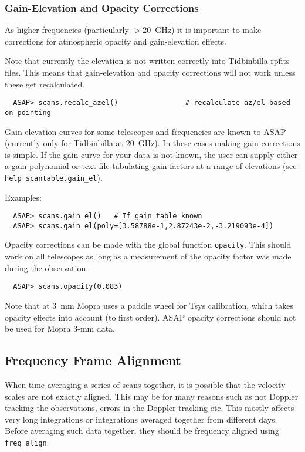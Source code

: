 \documentclass[11pt]{article}
\newcommand{\cmd}[1]{{\tt #1}}
\begin{document}
\subsubsection{Gain-Elevation and Opacity Corrections}
\label{sec:gainel}

As higher frequencies (particularly $>$20~GHz)
it is important to make corrections for atmospheric opacity and
gain-elevation effects.

Note that currently the elevation is not written correctly into
Tidbinbilla rpfits files. This means that gain-elevation and opacity
corrections will not work unless these get recalculated.

\begin{verbatim}
  ASAP> scans.recalc_azel()                # recalculate az/el based on pointing
\end{verbatim}

Gain-elevation curves for some telescopes and frequencies are known to
ASAP (currently only for Tidbinbilla at 20~GHz).  In these cases
making gain-corrections is simple.  If the gain curve for your data is
not known, the user can supply either a gain polynomial or text file
tabulating gain factors at a range of elevations (see \cmd{help
scantable.gain\_el}).

Examples:

\begin{verbatim}
  ASAP> scans.gain_el()   # If gain table known
  ASAP> scans.gain_el(poly=[3.58788e-1,2.87243e-2,-3.219093e-4])
\end{verbatim}

Opacity corrections can be made with the global
function \cmd{opacity}. This should work on all telescopes as long as
a measurement of the opacity factor was made during the observation.

\begin{verbatim}
  ASAP> scans.opacity(0.083)
\end{verbatim}

Note that at 3~mm Mopra uses a paddle wheel for Tsys calibration,
which takes opacity effects into account (to first order). ASAP
opacity corrections should not be used for Mopra 3-mm data.

\subsection{Frequency Frame Alignment}
\label{sec:freqalign}

When time
averaging a series of scans together, it is possible that the velocity
scales are not exactly aligned.  This may be for many reasons such as
not Doppler tracking the observations, errors in the Doppler tracking
etc.  This mostly affects very long integrations or integrations
averaged together from different days.  Before averaging such data
together, they should be frequency aligned using \cmd{freq\_align}.
\end{document}
